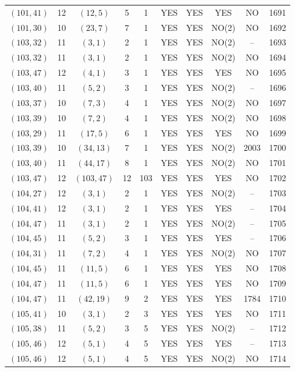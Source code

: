 \begin{longtable}{|c|c|c|c|c|c|c|c|c|c|}
$(101, 41)$ & 12 & $(12, 5)$ & 5 & 1 & YES & YES & YES & NO & 1691\\
$(101, 30)$ & 10 & $(23, 7)$ & 7 & 1 & YES & YES & NO(2) & NO & 1692\\
$(103, 32)$ & 11 & $(3, 1)$ & 2 & 1 & YES & YES & NO(2) & -- & 1693\\
$(103, 32)$ & 11 & $(3, 1)$ & 2 & 1 & YES & YES & NO(2) & NO & 1694\\
$(103, 47)$ & 12 & $(4, 1)$ & 3 & 1 & YES & YES & YES & NO & 1695\\
$(103, 40)$ & 11 & $(5, 2)$ & 3 & 1 & YES & YES & NO(2) & -- & 1696\\
$(103, 37)$ & 10 & $(7, 3)$ & 4 & 1 & YES & YES & NO(2) & NO & 1697\\
$(103, 39)$ & 10 & $(7, 2)$ & 4 & 1 & YES & YES & NO(2) & NO & 1698\\
$(103, 29)$ & 11 & $(17, 5)$ & 6 & 1 & YES & YES & YES & NO & 1699\\
$(103, 39)$ & 10 & $(34, 13)$ & 7 & 1 & YES & YES & NO(2) & 2003 & 1700\\
$(103, 40)$ & 11 & $(44, 17)$ & 8 & 1 & YES & YES & NO(2) & NO & 1701\\
$(103, 47)$ & 12 & $(103, 47)$ & 12 & 103 & YES & YES & YES & NO & 1702\\
$(104, 27)$ & 12 & $(3, 1)$ & 2 & 1 & YES & YES & NO(2) & -- & 1703\\
$(104, 41)$ & 12 & $(3, 1)$ & 2 & 1 & YES & YES & YES & -- & 1704\\
$(104, 47)$ & 11 & $(3, 1)$ & 2 & 1 & YES & YES & NO(2) & -- & 1705\\
$(104, 45)$ & 11 & $(5, 2)$ & 3 & 1 & YES & YES & YES & -- & 1706\\
$(104, 31)$ & 11 & $(7, 2)$ & 4 & 1 & YES & YES & NO(2) & NO & 1707\\
$(104, 45)$ & 11 & $(11, 5)$ & 6 & 1 & YES & YES & YES & NO & 1708\\
$(104, 47)$ & 11 & $(11, 5)$ & 6 & 1 & YES & YES & YES & NO & 1709\\
$(104, 47)$ & 11 & $(42, 19)$ & 9 & 2 & YES & YES & YES & 1784 & 1710\\
$(105, 41)$ & 10 & $(3, 1)$ & 2 & 3 & YES & YES & YES & NO & 1711\\
$(105, 38)$ & 11 & $(5, 2)$ & 3 & 5 & YES & YES & NO(2) & -- & 1712\\
$(105, 46)$ & 12 & $(5, 1)$ & 4 & 5 & YES & YES & YES & -- & 1713\\
$(105, 46)$ & 12 & $(5, 1)$ & 4 & 5 & YES & YES & NO(2) & NO & 1714\\

\end{longtable}
